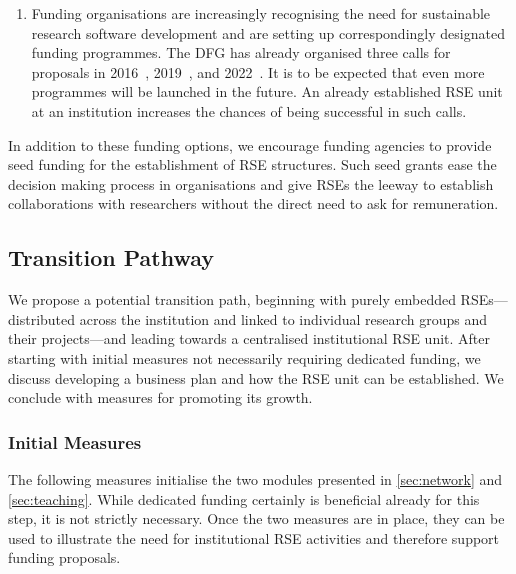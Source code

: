\documentclass[a4paper]{article}
\begin{document}
\begin{enumerate}
      For example, the DFG allows requesting funding for “central service units or external service providers” in grant proposals aimed at developing research software~\autocite{katerbow_dfg_rse_2024}.
\item Funding organisations are increasingly recognising the need for sustainable research software development and are setting up correspondingly designated funding programmes.
      The DFG has already organised three calls for proposals in 2016~\autocite{DFGCall2016NachhaltigkeitFS}, 2019~\autocite{DFGCall2019Qualitaetssicherung}, and 2022~\autocite{DFGCall2022ResearchSoftware,katerbow_dfg_rse_funding_2018}.
      It is to be expected that even more programmes will be launched in the future.
      An already established RSE unit at an institution increases the chances of being successful in such calls.
\end{enumerate}

In addition to these funding options, we encourage funding agencies to provide seed funding for the establishment of RSE structures.
Such seed grants ease the decision making process in organisations and give RSEs the leeway to establish collaborations with researchers without the direct need to ask for remuneration.

\subsection{Transition Pathway}

We propose a potential transition path, beginning with purely embedded RSEs---distributed across the institution and linked to individual research groups and their projects---and leading towards a centralised institutional RSE unit.
After starting with initial measures not necessarily requiring dedicated funding, we discuss developing a business plan and how the RSE unit can be established.
We conclude with measures for promoting its growth.

\subsubsection{Initial Measures}
The following measures initialise the two modules presented in \autoref{sec:network} and \autoref{sec:teaching}.
While dedicated funding certainly is beneficial already for this step, it is not strictly necessary.
Once the two measures are in place, they can be used to illustrate the need for institutional RSE activities and therefore support funding proposals.
\end{document}
